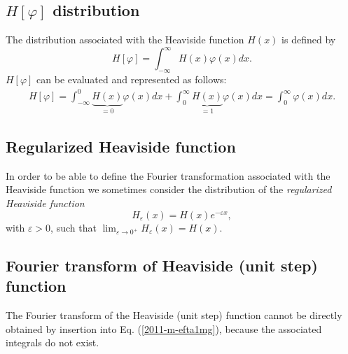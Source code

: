 \subsection{$H  \left[ \varphi \right]$ distribution}
The distribution associated with the Heaviside function $H(x)$ is defined by
\begin{equation}
H \left[ \varphi \right] =
\int_{-\infty}^\infty  H(x)  \varphi(x) dx.
 \end{equation}
$H  \left[ \varphi \right]$
can be evaluated and represented as follows:
\begin{equation}
\begin{split}
H  \left[ \varphi \right]
=
\int_{-\infty}^0  \underbrace{H(x)}_{=0} \varphi(x) dx
+
\int_{0}^\infty  \underbrace{H(x)}_{=1} \varphi(x) dx
=
\int_{0}^\infty      \varphi(x) dx
.
\end{split}
\end{equation}

\subsection{Regularized Heaviside function}
In order to be able to define the Fourier transformation
associated with the Heaviside function  we sometimes
consider the distribution of the {\em regularized Heaviside function}
\begin{equation}
H_\varepsilon (x) =H(x)e^{-\varepsilon x},
\label{2012-m-ch-di-rhfun}
\end{equation}
 with $\varepsilon >0$,
such that $\lim_{\varepsilon \rightarrow 0^+}  H_\varepsilon (x) =H (x)$.



\subsection{Fourier transform  of  Heaviside (unit step) function}

The Fourier transform of the Heaviside (unit step) function
cannot be directly obtained by insertion into Eq. (\ref{2011-m-efta1mg}), because the associated integrals do not exist.

